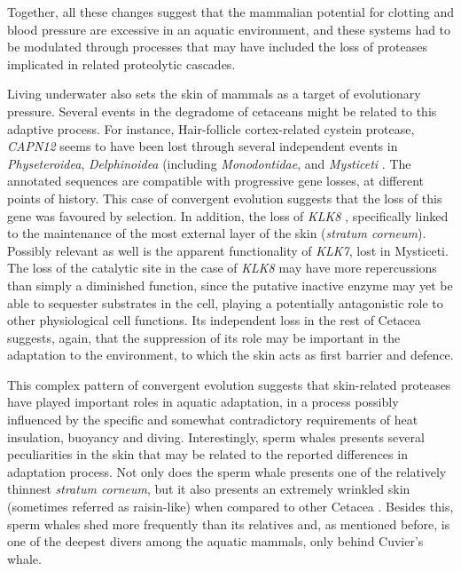 Together, all these changes suggest that the mammalian potential for clotting and blood pressure are excessive in an aquatic environment, and these systems had to be modulated through processes that may have included the loss of proteases implicated in related proteolytic cascades.

Living underwater also sets the skin of mammals as a target of evolutionary pressure.
Several events in the degradome of cetaceans might be related to this adaptive process.
For instance, Hair-follicle cortex-related cystein protease, \textit{CAPN12} seems to have been lost through several independent events in \textit{Physeteroidea}, \textit{Delphinoidea} (including \textit{Monodontidae}, and \textit{Mysticeti}%
.
The annotated sequences are compatible with progressive gene losses, at different points of history.
This case of convergent evolution suggests that the loss of this gene was favoured by selection.
In addition, the loss of \textit{KLK8}%
, specifically linked to the maintenance of the most external layer of the skin (\textit{stratum corneum}).
Possibly relevant as well is the apparent functionality of \textit{KLK7}, lost in Mysticeti.
The loss of the catalytic  site in the case of \textit{KLK8} may have more repercussions than simply a diminished function, since the putative inactive enzyme may yet be able to sequester substrates in the cell, playing a potentially antagonistic role to other physiological cell functions.
Its independent loss in the rest of Cetacea suggests, again, that the suppression of its role may be important in the adaptation to the environment, to which the skin acts as first barrier and defence.

This complex pattern of convergent evolution suggests that skin-related proteases have played important roles in aquatic adaptation, in a process possibly influenced by the specific and somewhat contradictory requirements of heat insulation, buoyancy and diving.
Interestingly, sperm whales presents several peculiarities in the skin that may be related to the reported differences in adaptation process.
Not only does the sperm whale presents one of the relatively thinnest \textit{stratum corneum}, but it also presents an extremely wrinkled skin (sometimes referred as raisin-like) when compared to other Cetacea \cite{Sokolov1982}.
Besides this, sperm whales shed more frequently than its relatives and, as mentioned before, is one of the deepest divers among the aquatic mammals, only behind Cuvier's whale.

